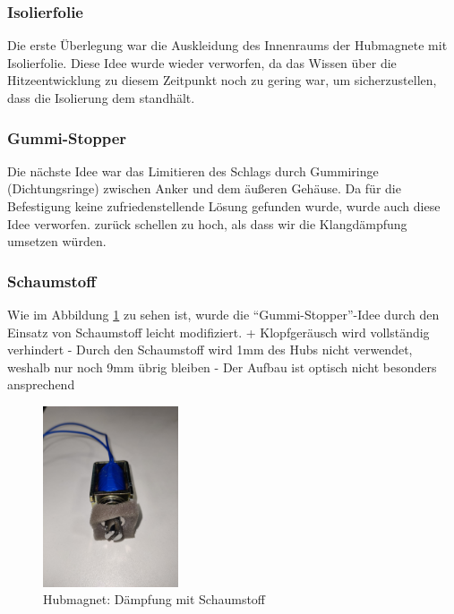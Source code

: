 \subsubsection{Isolierfolie}

Die erste Überlegung war die Auskleidung des Innenraums der Hubmagnete mit Isolierfolie.
Diese Idee wurde wieder verworfen, da das Wissen über die Hitzeentwicklung zu diesem Zeitpunkt noch zu gering war, um sicherzustellen, dass die Isolierung dem standhält. %

\subsubsection{Gummi-Stopper}

Die nächste Idee war das Limitieren des Schlags durch Gummiringe (Dichtungsringe) %
zwischen Anker und dem äußeren Gehäuse.
Da für die Befestigung keine zufriedenstellende Lösung gefunden wurde, wurde auch diese Idee verworfen.
zurück schellen zu hoch, als dass wir die Klangdämpfung umsetzen würden. %

\subsubsection{Schaumstoff}

Wie im Abbildung \ref{fig:schaumstoff} zu sehen ist, wurde die \enquote{Gummi-Stopper}-Idee durch den Einsatz von Schaumstoff leicht modifiziert. \newline
+ Klopfgeräusch wird vollständig verhindert \newline
- Durch den Schaumstoff wird 1mm des Hubs nicht verwendet, weshalb nur noch 9mm übrig bleiben \newline
- Der Aufbau ist optisch nicht besonders ansprechend

\begin{figure}[htbp]
	\centering
	\includegraphics [width=4cm] {img/Daempfung_Schaumstoff}
	\caption{Hubmagnet: Dämpfung mit Schaumstoff}
	\label{fig:schaumstoff}
\end{figure}

